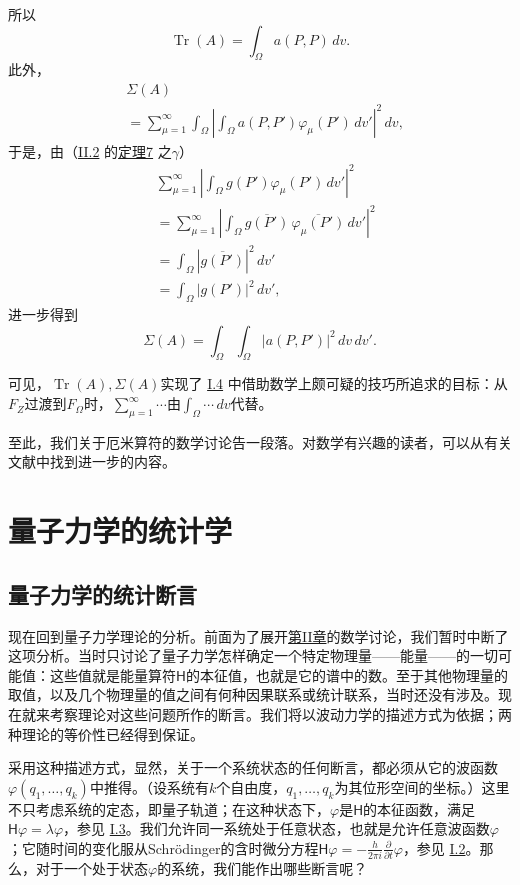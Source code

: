 \documentclass[fontsize=13pt,twoside,openany,headings=normal,parskip=false,bookmarkpackage=false,DIV=calc]{scrbook}
\begin{document}
所以
\[
\operatorname{Tr}(A)=\int_\Omega a(P,P)\,dv.
\]
此外，
\begin{align*}
&\Sigma(A)\\
&=\sum_{\mu=1}^{\infty}\int_\Omega
\left|\int_\Omega a(P,P')\varphi_\mu(P')\,dv'\right|^2\,dv,
\end{align*}
于是，由（\hyperref[sec:II.2]{II.2} 的\CJKglue \hyperref[thm:II.7]{定理7} 之$\gamma$）
\begin{align*}
&\sum_{\mu=1}^{\infty}\left|\int_\Omega g(P')\varphi_\mu(P')\,dv'\right|^2\\
&=\sum_{\mu=1}^{\infty}\left|\int_\Omega
\overline{g(P')}\,\overline{\varphi_\mu(P')}\,dv'\right|^2\\
&=\int_\Omega|\overline{g(P')}|^2\,dv'\\
&=\int_\Omega|g(P')|^2\,dv',
\end{align*}
进一步得到
\[
\Sigma(A)=\int_\Omega\int_\Omega|a(P,P')|^2\,dv\,dv'.
\]

可见，$\operatorname{Tr}(A),\allowbreak \Sigma(A)$实现了 \hyperref[sec:I.4]{I.4} 中借助数学上颇可疑的技巧所追求的目标：从$F_Z$过渡到$F_\Omega$时，$\sum_{\mu=1}^{\infty}\cdots$由$\int_\Omega\cdots\,dv$代替。

至此，我们关于厄米算符的数学讨论告一段落。对数学有兴趣的读者，可以从有关文献中找到进一步的内容。


\chapter{量子力学的统计学}\label{chap:III}
\section{量子力学的统计断言}\label{sec:III.1}
现在回到量子力学理论的分析。前面为了展开\CJKglue \hyperref[chap:II]{第II章}\CJKglue 的数学讨论，我们暂时中断了这项分析。当时只讨论了量子力学怎样确定一个特定物理量——能量——的一切可能值：这些值就是能量算符$\mathsf H$的本征值，也就是它的谱中的数。至于其他物理量的取值，以及几个物理量的值之间有何种因果联系或统计联系，当时还没有涉及。现在就来考察理论对这些问题所作的断言。我们将以波动力学的描述方式为依据；两种理论的等价性已经得到保证。

\hypertarget{origpage-102}{}\label{origpage-102}采用这种描述方式，显然，关于一个系统状态的任何断言，都必须从它的波函数$\varphi(q_1,\allowbreak \ldots,\allowbreak q_k)$中推得。（设系统有$k$个自由度，$q_1,\allowbreak \ldots,\allowbreak q_k$为其位形空间的坐标。）这里不只考虑系统的定态，即量子轨道；在这种状态下，$\varphi$是$\mathsf H$的本征函数，满足$\mathsf H\varphi=\lambda\varphi$，参见 \hyperref[sec:I.3]{I.3}。我们允许同一系统处于任意状态，也就是允许任意波函数$\varphi$；它随时间的变化服从Schrödinger的含时微分方程$\mathsf H\varphi=-\frac h{2\pi i}\frac\partial{\partial t}\varphi$，参见 \hyperref[sec:I.2]{I.2}。那么，对于一个处于状态$\varphi$的系统，我们能作出哪些断言呢？
\end{document}
